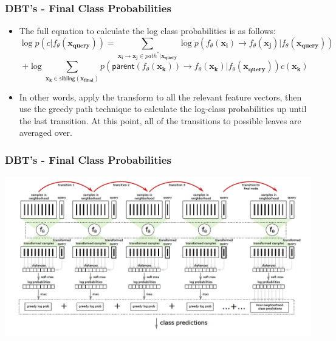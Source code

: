 \documentclass[pdf]{beamer}
\begin{document}
		\begin{frame}
	\frametitle{DBT's - Final Class Probabilities}
	\begin{itemize}
		\item The full equation to calculate the log class probabilities is as follows:
		$$ \log p(c |f_{\theta}(\mathbf{x_{query}})) = \sum_{\mathbf{x_i} \rightarrow \mathbf{x_j} \in path^{*} | \mathbf{x_{query}}} \log p(f_{\theta}(\mathbf{x_i}) \rightarrow f_{\theta}(\mathbf{x_j}) | f_{\theta}(\mathbf{x_{query}}))$$
		$$ + \log \sum_{\mathbf{x_k} \in \mathsf{sibling}(\mathbf{x_{final}})} p(\mathsf{parent}(f_{\theta}(\mathbf{x_k})) \rightarrow f_{\theta}(\mathbf{x_k}) | f_{\theta}(\mathbf{x_{query}}))c(\mathbf{x_k})$$
		\item In other words, apply the transform to all the relevant feature vectors, then use the greedy path technique to calculate the log-class probabilities up until the last transition. At this point, all of the transitions to possible leaves are averaged over. 
	\end{itemize}
	\end{frame}

\begin{frame}
\frametitle{DBT's - Final Class Probabilities}
	\includegraphics[scale=0.59]{Graphics/papershot}
\end{frame}
\end{document}
